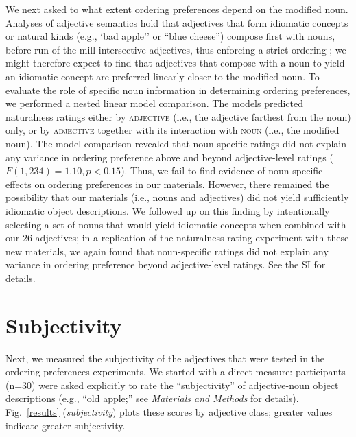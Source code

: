 \documentclass{pnastwo}
\newcommand{\ndg}[1]{\textcolor{Green}{[ndg: #1]}}
\begin{document}
\begin{article}
We next asked to what extent ordering preferences depend on the modified noun. Analyses of adjective semantics hold that adjectives that form idiomatic concepts or natural kinds (e.g., `bad apple'' or ``blue cheese'') compose first with nouns, before run-of-the-mill intersective adjectives, thus enforcing a strict ordering \cite{mcnallyboleda2004,svenonius2008}; we might therefore expect to find that adjectives that compose with a noun to yield an idiomatic concept are preferred linearly closer to the modified noun. 
To evaluate the role of specific noun information in determining ordering preferences, we performed a nested linear model comparison. The models predicted naturalness ratings either by \textsc{adjective} (i.e., the adjective farthest from the noun) only, or by \textsc{adjective} together with its interaction with \textsc{noun} (i.e., the modified noun).
The model comparison revealed that noun-specific ratings did not explain any variance in ordering preference above and beyond adjective-level ratings ($F(1,234) = 1.10, p < 0.15$).  Thus, we fail to find evidence of noun-specific effects on ordering preferences in our materials. However, there remained the possibility that our materials (i.e., nouns and adjectives) did not yield sufficiently idiomatic object descriptions. We followed up on this finding by intentionally selecting a set of nouns that would yield idiomatic concepts when combined with our 26 adjectives; in a replication of the naturalness rating experiment with these new materials, we again found that noun-specific ratings did not explain any variance in ordering preference beyond adjective-level ratings. See the SI for details.


\section{Subjectivity}

Next, we measured the subjectivity of the adjectives that were tested in the ordering preferences experiments. We started with a direct measure: participants (n=30) were asked explicitly to rate the ``subjectivity'' of adjective-noun object descriptions (e.g.,  ``old apple;'' see \emph{Materials and Methods} for details).
Fig.\ \ref{results} (\emph{subjectivity}) plots these scores by adjective class; greater values indicate greater subjectivity.


\end{article}
\end{document}

